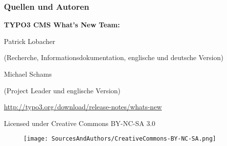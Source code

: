 \begin{frame}[fragile]
	\frametitle{Quellen und Autoren}

	\vspace{-0.6cm}

	\centerline{\textbf{TYPO3 CMS What's New Team:}}

	\begin{center}
		\smaller
			\centerline{Patrick Lobacher}
			\centerline{(Recherche, Informationsdokumentation, englische und deutsche Version)}
			\vspace{0.1cm}
			\centerline{Michael Schams}
			\centerline{(Project Leader und englische Version)}
		\normalsize
	\end{center}

	\vspace{0.4cm}

	\smaller\begin{center}\url{http://typo3.org/download/release-notes/whats-new}\end{center}\normalsize

	\vspace{0.8cm}

	\smaller\begin{center}Licensed under Creative Commons BY-NC-SA 3.0\end{center}\normalsize
	\begin{figure}\vspace*{-0.4cm}
		\texttt{[image: SourcesAndAuthors/CreativeCommons-BY-NC-SA.png]}
	\end{figure}

\end{frame}

